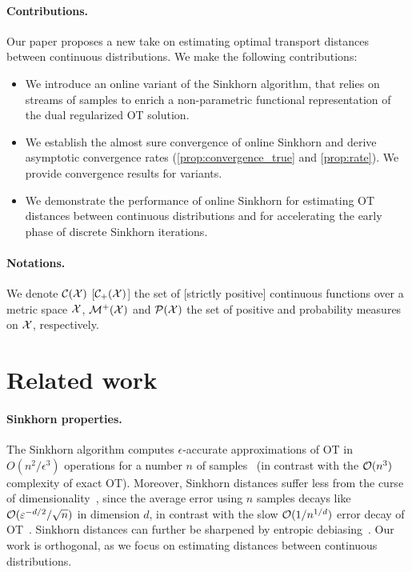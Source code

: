 \paragraph{Contributions.} Our paper proposes a new take on estimating optimal transport distances between continuous distributions. We make the following contributions:
\begin{itemize}[topsep=0pt, partopsep=0pt]
    \item We introduce an online variant of the Sinkhorn algorithm, that relies on
    streams of samples to enrich a non-parametric
    functional representation of the dual regularized OT solution.
    \item We establish the almost sure convergence of online Sinkhorn and derive asymptotic convergence rates 
    (\autoref{prop:convergence_true} and \ref{prop:rate}). We provide
    convergence results for variants.
    \item We demonstrate the performance of online Sinkhorn for estimating OT
    distances between continuous distributions and for accelerating the early
    phase of discrete Sinkhorn iterations.
\end{itemize}
% 
\paragraph{Notations.} We denote $\mathcal{C}(\mathcal{X})$ [$\mathcal{C}_+(\mathcal{X})$] the set of [strictly
positive] continuous functions over a metric space $\mathcal{X}$, $\mathcal{M}^+(\mathcal{X})$ and
$\mathcal{P}(\mathcal{X})$ the set of positive and probability measures on $\mathcal{X}$, respectively.

\section{Related work}\label{sec:related}

\paragraph{Sinkhorn properties.} The Sinkhorn algorithm computes $\epsilon$-accurate
approximations of OT in $O(n^2/\epsilon^3)$ operations for a number $n$ of
samples~\citep{altschuler2017near} (in contrast with the $\mathcal{O}(n^3)$ complexity of exact OT). Moreover, Sinkhorn distances suffer less from the
curse of dimensionality~\citep{2019-Genevay-aistats}, since the average error
using $n$ samples decays like $\mathcal{O}(\varepsilon^{-d/2}/\sqrt{n})$ in dimension
$d$, in contrast with the slow $\mathcal{O}(1/n^{1/d})$ error decay of
OT~\citep{dudley_speed_1969,weed2019sharp}. Sinkhorn distances can further be sharpened
by entropic debiasing~\citep{2019-Feydy-aistats}. Our work is orthogonal, as we focus on estimating distances between continuous distributions.

